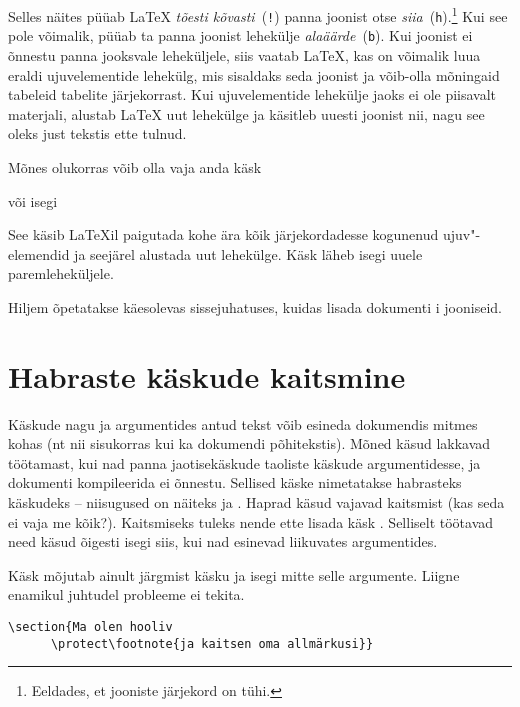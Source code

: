 \noindent Selles näites püüab \LaTeX{} \emph{tõesti
kõvasti}~(\texttt{!}) panna joonist otse
\emph{siia}~(\texttt{h}).\footnote{Eeldades, et jooniste järjekord on
tühi.} Kui see pole võimalik, püüab ta panna joonist lehekülje
\emph{alaäärde}~(\texttt{b}). Kui joonist ei õnnestu panna jooksvale
leheküljele, siis vaatab \LaTeX, kas on võimalik luua eraldi
ujuvelementide lehekülg, mis sisaldaks seda joonist ja võib-olla
mõningaid tabeleid tabelite järjekorrast. Kui ujuvelementide lehekülje
jaoks ei ole piisavalt materjali, alustab \LaTeX{} uut lehekülge ja
käsitleb uuesti joonist nii, nagu see oleks just tekstis ette tulnud.

Mõnes olukorras võib olla vaja anda käsk

\begin{lscommand}
 või isegi 
\end{lscommand}
\noindent See käsib \LaTeX il paigutada kohe ära kõik järjekordadesse
kogunenud ujuv"-elemendid ja seejärel alustada uut lehekülge. Käsk
 läheb isegi uuele
paremleheküljele.\enlargethispage{\baselineskip}

Hiljem õpetatakse käesolevas sissejuhatuses, kuidas lisada dokumenti \PSi
i jooniseid.

\section{Habraste käskude kaitsmine}

Käskude nagu  ja  argumentides antud tekst võib
esineda dokumendis mitmes kohas (nt nii sisukorras kui ka dokumendi
põhitekstis). Mõned käsud lakkavad töötamast, kui nad panna
jaotisekäskude  taoliste käskude argumentidesse, ja
dokumenti kompileerida ei õnnestu. Sellised käske nimetatakse
habrasteks käskudeks -- niisugused on näiteks
 ja . Haprad käsud vajavad kaitsmist (kas seda
ei vaja me kõik?). Kaitsmiseks tuleks nende ette lisada käsk
. Selliselt töötavad need käsud õigesti isegi siis, kui nad
esinevad liikuvates argumentides.

Käsk  mõjutab ainult järgmist käsku ja isegi mitte selle
argumente. Liigne  enamikul juhtudel probleeme ei tekita.

\begin{code}
\verb|\section{Ma olen hooliv|\\
\verb|      \protect\footnote{ja kaitsen oma allmärkusi}}|
\end{code}


